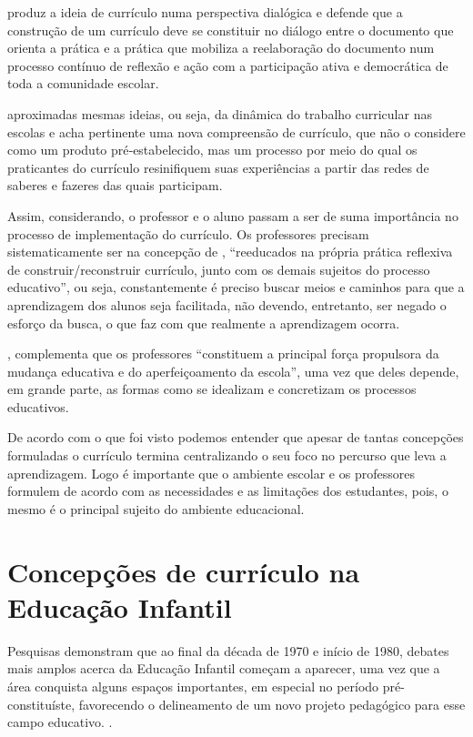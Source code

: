 \begin{refsection}
    \textcite{SOBRAL2007Propostas} produz a ideia de currículo numa perspectiva dialógica e defende que a construção de um currículo deve se constituir no diálogo entre o documento que orienta a prática e a prática que mobiliza a reelaboração do documento num processo contínuo de reflexão e ação com a participação ativa e democrática de toda a comunidade escolar.  

    \textcite{OLIVEIRA2013Novas} aproximadas mesmas ideias, ou seja, da dinâmica do trabalho curricular nas escolas e acha pertinente uma nova compreensão de currículo, que não o considere como um produto pré‐estabelecido, mas um processo por meio do qual os praticantes do currículo resinifiquem suas experiências a partir das redes de saberes e fazeres das quais participam.  

    Assim, considerando, o professor e o aluno passam a ser de suma importância no processo de implementação do currículo. Os professores precisam sistematicamente ser na concepção de \textcite[p.~12]{SCOCUGLIA2014Paulo}, “reeducados na própria prática reflexiva de construir/reconstruir currículo, junto com os demais sujeitos do processo educativo”, ou seja, constantemente é preciso buscar meios e caminhos para que a aprendizagem dos alunos seja facilitada, não devendo, entretanto, ser negado o esforço da busca, o que faz com que realmente a aprendizagem ocorra. 

    \textcite[p.~10]{MORGADO2005Currículo}, complementa que os professores “constituem a principal força propulsora da mudança educativa e do aperfeiçoamento da escola”, uma vez que deles depende, em grande parte, as formas como se idealizam e concretizam os processos educativos. 

    De acordo com o que foi visto podemos entender que apesar de tantas concepções formuladas o currículo termina centralizando o seu foco no percurso que leva a aprendizagem. Logo é importante que o ambiente escolar e os professores formulem de acordo com as necessidades e as limitações dos estudantes, pois, o mesmo é o principal sujeito do ambiente educacional.


    \section{Concepções de currículo na Educação Infantil}

    Pesquisas demonstram que ao final da década de 1970 e início de 1980, debates mais amplos acerca da Educação Infantil começam a aparecer, uma vez que a área conquista alguns espaços importantes, em especial no período pré-constituíste, favorecendo o delineamento de um novo projeto pedagógico para esse campo educativo. \cite{OLIVEIRA2002Educação}. 


\end{refsection}
